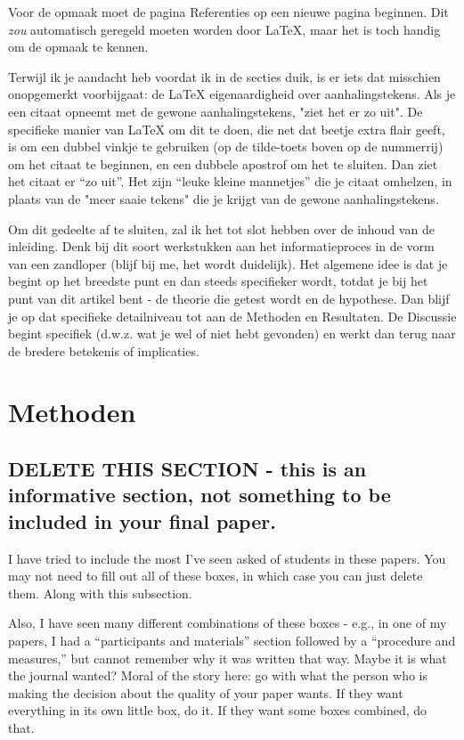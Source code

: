 \documentclass[stu,12pt,floatsintext]{apa7}
\begin{document}
Voor de opmaak moet de pagina Referenties op een nieuwe pagina beginnen. Dit \textit{zou} automatisch geregeld moeten worden door \LaTeX{}, maar het is toch handig om de opmaak te kennen.

Terwijl ik je aandacht heb voordat ik in de secties duik, is er iets dat misschien onopgemerkt voorbijgaat: de \LaTeX{} eigenaardigheid over aanhalingstekens. 
Als je een citaat opneemt met de gewone aanhalingstekens, "ziet het er zo uit". 
De specifieke manier van \LaTeX{} om dit te doen, die net dat beetje extra flair geeft, is om een dubbel vinkje te gebruiken (op de tilde-toets boven op de nummerrij) om het citaat te beginnen, en een dubbele apostrof om het te sluiten. Dan ziet het citaat er ``zo uit''. 
Het zijn ``leuke kleine mannetjes'' die je citaat omhelzen, in plaats van de "meer saaie tekens" die je krijgt van de gewone aanhalingstekens.

Om dit gedeelte af te sluiten, zal ik het tot slot hebben over de inhoud van de inleiding. Denk bij dit soort werkstukken aan het informatieproces in de vorm van een zandloper (blijf bij me, het wordt duidelijk). Het algemene idee is dat je begint op het breedste punt en dan steeds specifieker wordt, totdat je bij het punt van dit artikel bent - de theorie die getest wordt en de hypothese. 
Dan blijf je op dat specifieke detailniveau tot aan de Methoden en Resultaten. 
De Discussie begint specifiek (d.w.z. wat je wel of niet hebt gevonden) en werkt dan terug naar de bredere betekenis of implicaties.

\section{Methoden}

\subsection{DELETE THIS SECTION - this is an informative section, not something to be included in your final paper.}

I have tried to include the most I've seen asked of students in these papers. You may not need to fill out all of these boxes, in which case you can just delete them. Along with this subsection.

Also, I have seen many different combinations of these boxes - e.g., in one of my papers, I had a ``participants and materials'' section followed by a ``procedure and measures,'' but cannot remember why it was written that way. Maybe it is what the journal wanted? Moral of the story here: go with what the person who is making the decision about the quality of your paper wants. If they want everything in its own little box, do it. If they want some boxes combined, do that.
\end{document}
